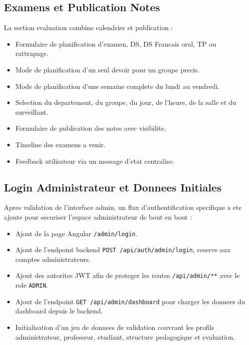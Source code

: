 \documentclass[12pt,a4paper]{report}
\begin{document}
\subsection{Examens et Publication Notes}

La section evaluation combine calendrier et publication :

\begin{itemize}[itemsep=0.3em]
    \item Formulaire de planification d'examen, DS, DS Francais oral, TP ou rattrapage.
    \item Mode de planification d'un seul devoir pour un groupe precis.
    \item Mode de planification d'une semaine complete du lundi au vendredi.
    \item Selection du departement, du groupe, du jour, de l'heure, de la salle et du surveillant.
    \item Formulaire de publication des notes avec visibilite.
    \item Timeline des examens a venir.
    \item Feedback utilisateur via un message d'etat centralise.
\end{itemize}

\subsection{Login Administrateur et Donnees Initiales}

Apres validation de l'interface admin, un flux d'authentification specifique a ete ajoute pour securiser l'espace administrateur de bout en bout :

\begin{itemize}[itemsep=0.3em]
    \item Ajout de la page Angular \texttt{/admin/login}.
    \item Ajout de l'endpoint backend \texttt{POST /api/auth/admin/login}, reserve aux comptes administrateurs.
    \item Ajout des autorites JWT afin de proteger les routes \texttt{/api/admin/**} avec le role \texttt{ADMIN}.
    \item Ajout de l'endpoint \texttt{GET /api/admin/dashboard} pour charger les donnees du dashboard depuis le backend.
    \item Initialisation d'un jeu de donnees de validation couvrant les profils administrateur, professeur, etudiant, structure pedagogique et evaluation.
\end{itemize}
\end{document}
